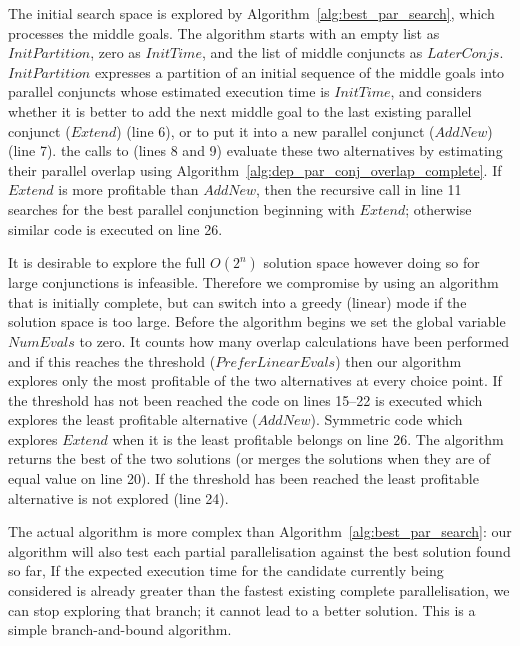 The initial search space is explored by
Algorithm~\ref{alg:best_par_search}, which processes the middle goals.
The algorithm starts with an empty list as  $InitPartition$,
zero as $InitTime$, and the list of middle conjuncts as $LaterConjs$.
$InitPartition$ expresses a partition of an initial sequence
of the middle goals into parallel conjuncts
whose estimated execution time is $InitTime$,
and considers whether it is better to add the next middle goal
to the last existing parallel conjunct ($Extend$) (line 6),
or to put it into a new parallel conjunct ($AddNew$) (line 7).
the calls to \findpartime (lines 8 and 9) evaluate these two alternatives by
estimating their parallel overlap using
Algorithm~\ref{alg:dep_par_conj_overlap_complete}.
If $Extend$ is more profitable than $AddNew$,
then the recursive call in line 11 searches for the best parallel
conjunction beginning with $Extend$;
otherwise similar code is executed on line 26.

It is desirable to explore the full $O(2^n)$ solution space however doing so
for large conjunctions is infeasible.
Therefore we compromise by using an algorithm that is
initially complete,
but can switch into a greedy (linear) mode if the solution space is too
large.
Before the algorithm begins we set the global variable $NumEvals$ to zero.
It counts how many overlap calculations have been performed
and if this reaches the threshold ($PreferLinearEvals$) then our algorithm
explores only the most profitable of the two alternatives at every choice
point.
If the threshold has not been reached the code on lines 15--22 is executed
which explores the least profitable alternative ($AddNew$).
Symmetric code which explores $Extend$ when it is the least profitable
belongs on line 26.
The algorithm returns the best of the two solutions
(or merges the solutions when they are of equal value on line 20).
If the threshold has been reached the least profitable alternative is not
explored (line 24).

The actual algorithm is more complex than
Algorithm~\ref{alg:best_par_search}:
our algorithm will also test each partial parallelisation against the best
solution found so far,
If the expected execution time for the candidate currently being considered
is already greater than the fastest existing complete parallelisation,
we can stop exploring that branch;
it cannot lead to a better solution.
This is a simple branch-and-bound algorithm.

